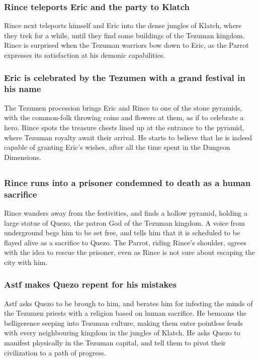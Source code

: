 \subsubsection{\Gls{Rince} teleports \Gls{Eric} and the party to Klatch}
\Gls{Rince} next teleports himself and \Gls{Eric} into the dense jungles of Klatch, where they
trek for a while, until they find some buildings of the Tezuman kingdom. \Gls{Rince} is surprised
when the Tezuman warriors bow down to \Gls{Eric}, as the \Gls{Parrot} expresses its satisfaction at
his demonic capabilities.

\subsubsection{\Gls{Eric} is celebrated by the Tezumen with a grand festival in his name}
The Tezumen procession brings \Gls{Eric} and \Gls{Rince} to one of the stone pyramids, with the
common-folk throwing coins and flowers at them, as if to celebrate a hero. \Gls{Rince} spots the
treasure chests lined up at the entrance to the pyramid, where Tezuman royalty await their arrival.
He starts to believe that he is indeed capable of granting \Gls{Eric}'s wishes, after all the time
spent in the Dungeon Dimensions.

\subsection{}
\subsubsection{\Gls{Rince} runs into a prisoner condemned to death as a human sacrifice}
\Gls{Rince} wanders away from the festivities, and finds a hollow pyramid, holding a large statue
of \Gls{Quezo}, the patron God of the Tezuman kingdom. A voice from underground begs him to be set
free, and tells him that it is scheduled to be flayed alive as a sacrifice to \Gls{Quezo}. The
\Gls{Parrot}, riding \Gls{Rince}'s shoulder, agrees with the idea to rescue the prisoner, even as
\Gls{Rince} is not sure about escaping the city with him.

\subsubsection{\Gls{Astf} makes \Gls{Quezo} repent for his mistakes}
\Gls{Astf} asks \Gls{Quezo} to be brough to him, and berates him for infesting the minds of the
Tezumen priests with a religion based on human sacrifice. He bemoans the belligerence seeping into
Tezuman culture, making them enter pointless feuds with every neighbouring kingdom in the jungles of
Klatch. He asks \Gls{Quezo} to manifest physically in the Tezuman capital, and tell them to pivot
their civilization to a path of progress.

